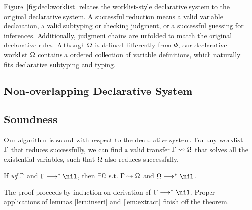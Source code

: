 Figure~\ref{fig:decl:worklist} relates the worklist-style declarative system
to the original declarative system.
A successful reduction means a valid variable declaration,
a valid subtyping or checking judgment, or a successful guessing for inferences.
Additionally, judgment chains are unfolded to match the original declarative rules.
Although $\Omega$ is defined differently from $\Psi$,
our declarative worklist $\Omega$ contains a ordered collection of variable definitions,
which naturally fits declarative subtyping and typing.


\subsection{Non-overlapping Declarative System}

\subsection{Soundness}

Our algorithm is sound with respect to the declarative system.
For any worklist $\Gamma$ that reduces successfully,
we can find a valid transfer $\Gamma\rightsquigarrow\Omega$ that solves all the existential variables,
such that $\Omega$ also reduces successfully.
\begin{theorem}[Soundness]
If \emph{wf }$\Gamma$ and $\Gm \redto \nil$, then $\exists \Omega$ s.t. $\Gamma\rightsquigarrow\Omega$ and $\Om\redto\nil$.
\end{theorem}

The proof proceeds by induction on derivation of $\Gm\redto\nil$.
Proper applications of lemmas \ref{lem:insert} and \ref{lem:extract}
finish off the theorem.

